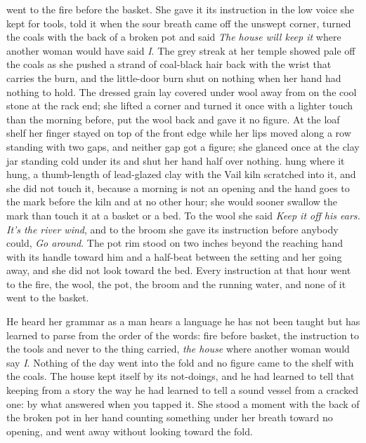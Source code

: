 \scenebreak

 went to the fire before the basket. She gave it its instruction in the low voice she kept for tools, told it  when the sour breath came off the unswept corner, turned the coals with the back of a broken pot and said \emph{The house will keep it} where another woman would have said \emph{I}. The grey streak at her temple showed pale off the coals as she pushed a strand of coal-black hair back with the wrist that carries the burn, and the little-door burn shut on nothing when her hand had nothing to hold. The dressed grain lay covered under wool away from  on the cool stone at the rack end; she lifted a corner and turned it once with a lighter touch than the morning before, put the wool back and gave it no figure. At the loaf shelf her finger stayed on top of the front edge while her lips moved along a row standing with two gaps, and neither gap got a figure; she glanced once at the clay jar standing cold under its  and shut her hand half over nothing.  hung where it hung, a thumb-length of lead-glazed clay with the Vail kiln scratched into it, and she did not touch it, because a morning is not an opening and the hand goes to the mark before the kiln and at no other hour; she would sooner swallow the mark than touch it at a basket or a bed. To the wool she said \emph{Keep it off his ears. It's the river wind}, and to the broom she gave its instruction before anybody could, \emph{Go around}. The pot rim stood on  two inches beyond the reaching hand with its handle toward him and a half-beat between the setting and her going away, and she did not look toward the bed. Every instruction at that hour went to the fire, the wool, the pot, the broom and the running water, and none of it went to the basket.

He heard her grammar as a man hears a language he has not been taught but has learned to parse from the order of the words: fire before basket, the instruction to the tools and never to the thing carried, \emph{the house} where another woman would say \emph{I}. Nothing of the day went into the fold and no figure came to the shelf with the coals. The house kept itself by its not-doings, and he had learned to tell that keeping from a story the way he had learned to tell a sound vessel from a cracked one: by what answered when you tapped it. She stood a moment with the back of the broken pot in her hand counting something under her breath toward no opening, and went away without looking toward the fold.

